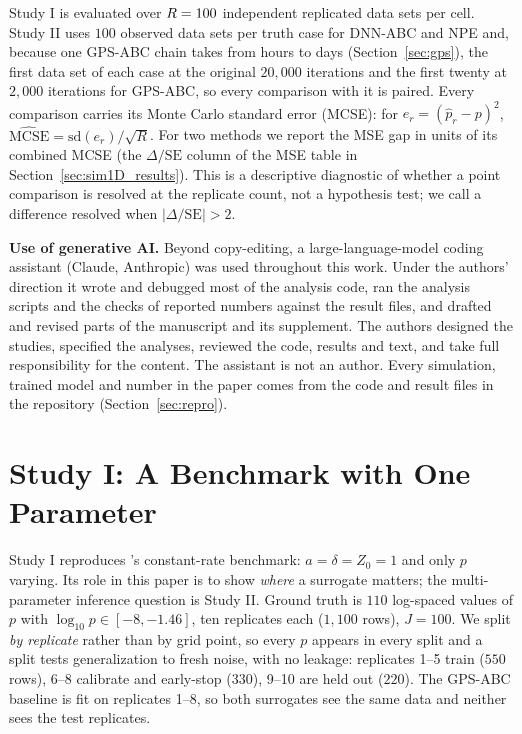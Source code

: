 \documentclass[sn-basic,iicol,pdflatex]{sn-jnl}
\begin{document}
Study I is evaluated over $R=100$ independent replicated data sets per cell. Study II
uses $100$ observed data sets per truth case for DNN-ABC and NPE and, because one
GPS-ABC chain takes from hours to days (Section~\ref{sec:gps}), the first data set of each case at the
original $20{,}000$ iterations and the first twenty at $2{,}000$ iterations for GPS-ABC, so every comparison with it is paired. Every comparison carries its Monte
Carlo standard error (MCSE): for $e_r = (\hat p_r - p)^2$,
$\widehat{\mathrm{MCSE}} = \mathrm{sd}(e_r)/\sqrt{R}$. For two methods we report
the MSE gap in units of its combined MCSE (the $\Delta/\mathrm{SE}$ column of
the MSE table in Section~\ref{sec:sim1D_results}). This is a descriptive diagnostic of whether a point
comparison is resolved at the replicate count, not a hypothesis test; we call a
difference resolved when $|\Delta/\mathrm{SE}|>2$.

\noindent\textbf{Use of generative AI.} Beyond copy-editing, a large-language-model coding assistant (Claude, Anthropic) was used throughout this work. Under the authors' direction it wrote and debugged most of the analysis code, ran the analysis scripts and the checks of reported numbers against the result files, and drafted and revised parts of the manuscript and its supplement. The authors designed the studies, specified the analyses, reviewed the code, results and text, and take full responsibility for the content. The assistant is not an author. Every simulation, trained model and number in the paper comes from the code and result files in the repository (Section~\ref{sec:repro}).

\section{Study I: A Benchmark with One Parameter}
\label{sec:sim1D}

Study I reproduces \citeauthor{lu2023}'s constant-rate benchmark: $a=\delta=Z_0=1$
and only $p$ varying. Its role in this paper is to show \emph{where} a surrogate
matters; the multi-parameter inference question is Study II. Ground truth is
$110$ log-spaced values of $p$ with $\log_{10}p \in [-8,-1.46]$, ten replicates each
($1{,}100$ rows), $J=100$. We split \emph{by replicate} rather than by grid
point, so every $p$ appears in every split and a split tests generalization to
fresh noise, with no leakage: replicates 1--5 train ($550$ rows), 6--8 calibrate
and early-stop ($330$), 9--10 are held out ($220$). The GPS-ABC baseline is fit
on replicates 1--8, so both surrogates see the same data and neither sees the
test replicates.
\end{document}
